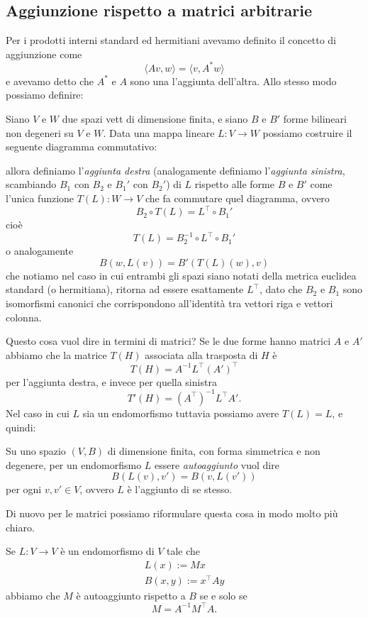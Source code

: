 \documentclass[11pt]{scrartcl}
\begin{document}
	\subsection{Aggiunzione rispetto a matrici arbitrarie}
	
	Per i prodotti interni standard ed hermitiani avevamo definito il concetto di aggiunzione come
	$$\langle Av,w\rangle = \langle v,A^* w\rangle$$
	e avevamo detto che $A^*$ e $A$ sono una l'aggiunta dell'altra. Allo stesso modo possiamo definire:
	\begin{definition}[Aggiunzione]
		Siano $V$ e $W$ due spazi vett di dimensione finita, e siano $B$ e $B'$ forme bilineari non degeneri su $V$ e $W$. Data una mappa lineare $L:V\to W$ possiamo costruire il seguente diagramma commutativo:
		\begin{center}
		\end{center}
		allora definiamo l'\textit{aggiunta destra} (analogamente definiamo l'\textit{aggiunta sinistra}, scambiando $B_1$ con $B_2$ e $B_1'$ con $B_2'$) di $L$ rispetto alle forme $B$ e $B'$ come l'unica funzione $T(L):W\to V$ che fa commutare quel diagramma, ovvero 
		$$B_2\circ T(L)=L^\intercal \circ B_1'$$
		cioè
		$$T(L)=B_2^{-1}\circ L^\intercal \circ B_1'$$
		o analogamente
		$$B(w,L(v))=B'(T(L)(w),v)$$
		che notiamo nel caso in cui entrambi gli spazi siano notati della metrica euclidea standard (o hermitiana), ritorna ad essere esattamente $L^\intercal$, dato che $B_2$ e $B_1$ sono isomorfismi canonici che corrispondono all'identità tra vettori riga e vettori colonna. 
	\end{definition}
	Questo cosa vuol dire in termini di matrici? Se le due forme hanno matrici $A$ e $A'$ abbiamo che la matrice $T(H)$ associata alla trasposta di $H$ è 
	$$T(H)=A^{-1}L^\intercal\left(A'\right)^\intercal$$
	per l'aggiunta destra, e invece per quella sinistra
	$$T'(H)=\left(A^\intercal\right)^{-1}L^\intercal A'.$$
	Nel caso in cui $L$ sia un endomorfismo tuttavia possiamo avere $T(L)=L$, e quindi:
	\begin{definition}
		Su uno spazio $(V,B)$ di dimensione finita, con forma simmetrica e non degenere, per un endomorfismo $L$ essere \textit{autoaggiunto} vuol dire
		$$B(L(v),v')=B(v,L(v'))$$
		per ogni $v,v'\in V$, ovvero $L$ è l'aggiunto di se stesso. 
	\end{definition}
	Di nuovo per le matrici possiamo riformulare questa cosa in modo molto più chiaro. 
	\begin{proposition}
		Se $L:V\to V$ è un endomorfismo di $V$ tale che   
		\begin{gather*}
			L(x):=Mx \\
			B(x,y):=x^\intercal A y
		\end{gather*}
		abbiamo che $M$ è autoaggiunto rispetto a $B$ se e solo se
		$$M=A^{-1}M^\intercal A.$$
	\end{proposition}
	
\end{document}
